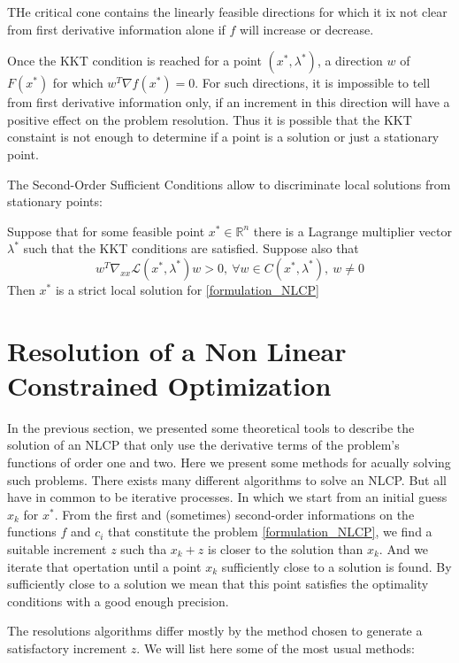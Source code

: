 THe critical cone contains the linearly feasible directions for which it ix not clear from first derivative information alone if $f$ will increase or decrease.

Once the KKT condition is reached for a point $(x^*, \lambda^*)$, a direction $w$ of $F(x^*)$ for which $w^T\nabla f(x^*)=0$.
For such directions, it is impossible to tell from first derivative information only, if an increment in this direction will have a positive effect on the problem resolution.
Thus it is possible that the KKT constaint is not enough to determine if a point is a solution or just a stationary point.

The Second-Order Sufficient Conditions allow to discriminate local solutions from stationary points:

\begin{theorem}
  Suppose that for some feasible point $x^*\in \mathbb{R}^n$ there is a Lagrange multiplier vector $\lambda^*$ such that the KKT conditions are satisfied. Suppose also that
  \begin{equation}
    w^T\nabla_{xx}\mathcal{L}(x^*,\lambda^*)w>0,\ \forall w\in C(x^*,\lambda^*),\ w\neq 0
  \end{equation}
  Then $x^*$ is a strict local solution for \ref{formulation_NLCP}
\end{theorem}

\section{Resolution of a Non Linear Constrained Optimization}

In the previous section, we presented some theoretical tools to describe the solution of an NLCP that only use the derivative terms of the problem's functions of order one and two.
Here we present some methods for acually solving such problems.
There exists many different algorithms to solve an NLCP.
But all have in common to be iterative processes.
In which we start from an initial guess $x_k$ for $x^*$.
From the first and (sometimes) second-order informations on the functions $f$ and $c_i$ that constitute the problem \ref{formulation_NLCP}, we find a suitable increment $z$ such tha $x_k+z$ is closer to the solution than $x_k$.
And we iterate that opertation until a point $x_k$ sufficiently close to a solution is found.
By sufficiently close to a solution we mean that this point satisfies the optimality conditions with a good enough precision.

The resolutions algorithms differ mostly by the method chosen to generate a satisfactory increment $z$. We will list here some of the most usual methods:


